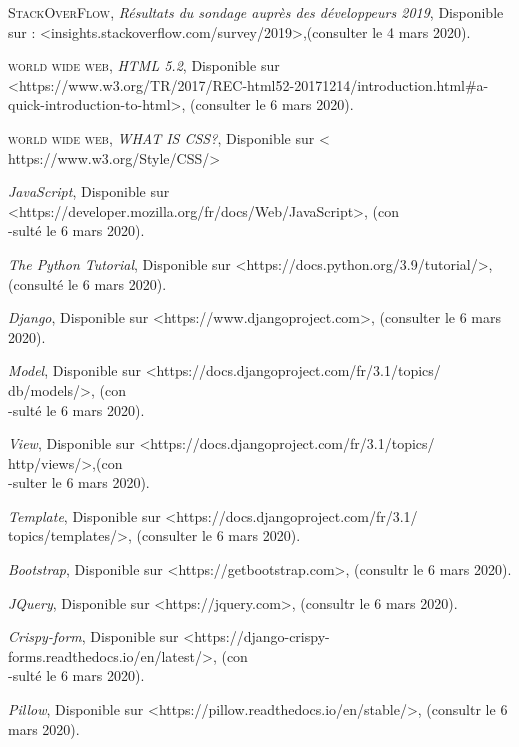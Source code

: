 \begin{thebibliography}{2}
         \textsc{StackOverFlow}, \emph{Résultats du sondage auprès des développeurs 2019}, Disponible sur : <insights.stackoverflow.com/survey/2019>,(consulter le 4 mars 2020). 

         \textsc{world wide web}, \emph{HTML 5.2}, Disponible sur <https://www.w3.org/TR/2017/REC-html52-20171214/introduction.html\#a-quick-introduction-to-html>, (consulter le 6 mars 2020).
        
         \textsc{world wide web}, \emph{WHAT IS CSS?}, Disponible sur < https://www.w3.org/Style/CSS/>
        
          \emph{JavaScript}, Disponible sur <https://developer.mozilla.org/fr/docs/Web/JavaScript>, (con\\-sulté le 6 mars 2020).
        
          \emph{The Python Tutorial}, Disponible sur <https://docs.python.org/3.9/tutorial/>, (consulté le 6 mars 2020).
        
          \emph{Django}, Disponible sur <https://www.djangoproject.com>, (consulter le 6 mars 2020). 
        
          \emph{Model}, Disponible sur <https://docs.djangoproject.com/fr/3.1/topics/
        db/models/>, (con\\-sulté le 6 mars 2020).
        
          \emph{View}, Disponible sur <https://docs.djangoproject.com/fr/3.1/topics/
        http/views/>,(con\\-sulter le 6 mars 2020).
        
         \emph{Template}, Disponible sur <https://docs.djangoproject.com/fr/3.1/
        topics/templates/>, (consulter le 6 mars 2020).
        
         \emph{Bootstrap}, Disponible sur <https://getbootstrap.com>, (consultr le 6 mars 2020).
        
         \emph{JQuery}, Disponible sur <https://jquery.com>, (consultr le 6 mars 2020).
        
         \emph{Crispy-form}, Disponible sur <https://django-crispy-
        forms.readthedocs.io/en/latest/>, (con\\-sulté le 6 mars 2020).
        
         \emph{Pillow}, Disponible sur <https://pillow.readthedocs.io/en/stable/>, (consultr le 6 mars 2020).
        

\end{thebibliography}
